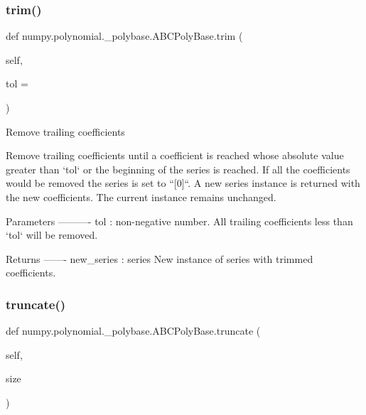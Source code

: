 \subsubsection{\texorpdfstring{trim()}{trim()}}
{\footnotesize\ttfamily def numpy.\+polynomial.\+\_\+polybase.\+A\+B\+C\+Poly\+Base.\+trim (\begin{DoxyParamCaption}\item[{}]{self,  }\item[{}]{tol = {} }\end{DoxyParamCaption})}

\begin{DoxyVerb}Remove trailing coefficients

Remove trailing coefficients until a coefficient is reached whose
absolute value greater than `tol` or the beginning of the series is
reached. If all the coefficients would be removed the series is set
to ``[0]``. A new series instance is returned with the new
coefficients.  The current instance remains unchanged.

Parameters
----------
tol : non-negative number.
    All trailing coefficients less than `tol` will be removed.

Returns
-------
new_series : series
    New instance of series with trimmed coefficients.\end{DoxyVerb}
 \mbox{\label{classnumpy_1_1polynomial_1_1__polybase_1_1ABCPolyBase_a6f6fb08396dbd3000483f8e4ce5868dc}} 
\subsubsection{\texorpdfstring{truncate()}{truncate()}}
{\footnotesize\ttfamily def numpy.\+polynomial.\+\_\+polybase.\+A\+B\+C\+Poly\+Base.\+truncate (\begin{DoxyParamCaption}\item[{}]{self,  }\item[{}]{size }\end{DoxyParamCaption})}

